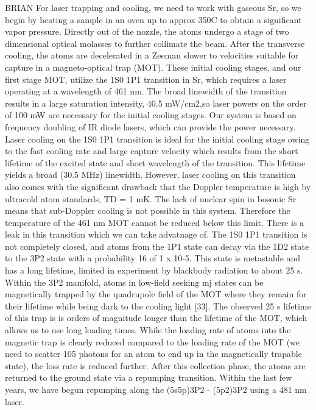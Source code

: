 BRIAN
For laser trapping and cooling, we need to work with gaseous Sr, so we begin by heating a sample in an oven up to approx 350C to obtain a significant vapor pressure. 
Directly out of the nozzle, the atoms undergo a stage of two dimensional optical molasses to further collimate the beam. 
After the transverse cooling, the atoms are decelerated in a Zeeman slower to velocities suitable for capture in a magneto-optical trap (MOT). 
These initial cooling stages, and our first stage MOT, utilize the 1S0 1P1 transition in Sr, which requires a laser operating at a wavelength of 461 nm. 
The broad linewidth of the transition results in a large saturation intensity, 40.5 mW/cm2,so laser powers on the order of 100 mW are necessary for the initial cooling stages. 
Our system is based on frequency doubling of IR diode lasers, which can provide the power necessary. 
Laser cooling on the 1S0 1P1 transition is ideal for the initial cooling stage owing to the fast cooling rate and large capture velocity which results from the short lifetime of the excited state and short wavelength of the transition. 
This lifetime yields a broad (30.5 MHz) linewidth. 
However, laser cooling on this transition also comes with the significant drawback that the Doppler temperature is high by ultracold atom standards, TD = 1 mK. 
The lack of nuclear spin in bosonic Sr means that sub-Doppler cooling is not possible in this system. 
Therefore the temperature of the 461 nm MOT cannot be reduced below this limit. 
There is a leak in this transition which we can take advatnage of. 
The 1S0 1P1 transition is not completely closed, and atoms from the 1P1 state can decay via the 1D2 state to the 3P2 state with a probability 16 of 1 x 10-5. 
This state is metastable and has a long lifetime, limited in experiment by blackbody radiation to about 25 s. Within the 3P2 manifold, atoms in low-field seeking mj states can be magnetically trapped by the quadrupole field of the MOT where they remain for their lifetime while being dark to the cooling light [33]. 
The observed 25 s lifetime of this trap is is orders of magnitude longer than the lifetime of the MOT, which allows us to use long loading times.
While the loading rate of atoms into the magnetic trap is clearly reduced compared to the loading rate of the MOT (we need to scatter 105 photons for an atom to end up in the magnetically trapable state), the loss rate is reduced further. 
After this collection phase, the atoms are returned to the ground state via a repumping transition. 
Within the last few years, we have begun repumping along the (5s5p)3P2 - (5p2)3P2 using a 481 nm laser. 

